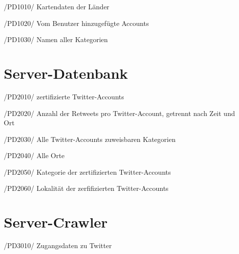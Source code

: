 \begin{itemize}
\section{GUI}
	\item[/PD1010/]Kartendaten der Länder
	\item[/PD1020/]Vom Benutzer hinzugefügte Accounts
	\item[/PD1030/]Namen aller Kategorien
	
\section{Server-Datenbank}
	\item[/PD2010/]zertifizierte Twitter-Accounts	
	\item[/PD2020/]Anzahl der Retweets pro Twitter-Account, getrennt nach Zeit und Ort
	\item[/PD2030/]Alle Twitter-Accounts zuweisbaren Kategorien
	\item[/PD2040/]Alle Orte
	\item[/PD2050/]Kategorie der zertifizierten Twitter-Accounts
	\item[/PD2060/]Lokalität der zerfifizierten Twitter-Accounts

\section{Server-Crawler}
	\item[/PD3010/]Zugangsdaten zu Twitter
\end{itemize}%
